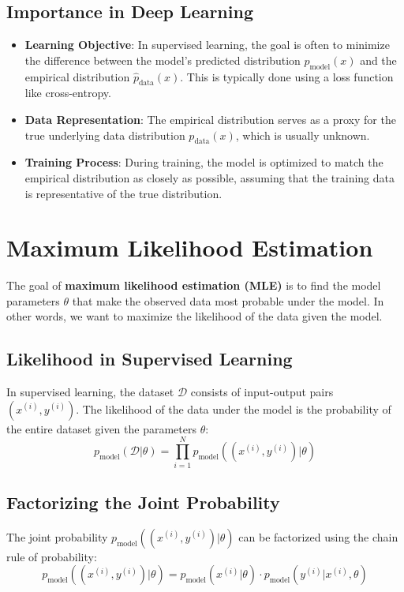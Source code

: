 \begin{notechapter}
\subsection{Importance in Deep Learning}
\begin{itemize}
    \item \textbf{Learning Objective}: In supervised learning, the goal is often to minimize the difference between the model's predicted distribution \( p_{\text{model}}(x) \) and the empirical distribution \( \hat{p}_{\text{data}}(x) \). This is typically done using a loss function like cross-entropy.
    \item \textbf{Data Representation}: The empirical distribution serves as a proxy for the true underlying data distribution \( p_{\text{data}}(x) \), which is usually unknown.
    \item \textbf{Training Process}: During training, the model is optimized to match the empirical distribution as closely as possible, assuming that the training data is representative of the true distribution.
\end{itemize}

\section{Maximum Likelihood Estimation}
The goal of \textbf{maximum likelihood estimation (MLE)} is to find the model parameters \( \theta \) that make the observed data most probable under the model. In other words, we want to maximize the likelihood of the data given the model.

\subsection{Likelihood in Supervised Learning}
In supervised learning, the dataset \( \mathcal{D} \) consists of input-output pairs \( (x^{(i)}, y^{(i)}) \). The likelihood of the data under the model is the probability of the entire dataset given the parameters \( \theta \):
\[
p_{\text{model}}(\mathcal{D} | \theta) = \prod_{i=1}^N p_{\text{model}}((x^{(i)}, y^{(i)}) | \theta)
\]

\subsection{Factorizing the Joint Probability}
The joint probability \( p_{\text{model}}((x^{(i)}, y^{(i)}) | \theta) \) can be factorized using the chain rule of probability:
\[
p_{\text{model}}((x^{(i)}, y^{(i)}) | \theta) = p_{\text{model}}(x^{(i)} | \theta) \cdot p_{\text{model}}(y^{(i)} | x^{(i)}, \theta)
\]


\end{notechapter}
